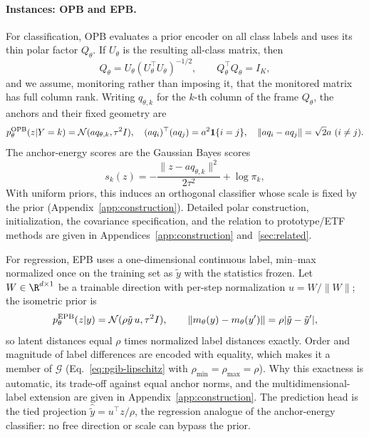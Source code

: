 \paragraph{Instances: OPB and EPB.}\label{sec:opb}
For classification, OPB evaluates a prior encoder on all class labels and uses its
thin polar factor $Q_\theta$. If $U_\theta$ is the resulting all-class matrix, then
\begin{equation}
Q_\theta=U_\theta(U_\theta^\top U_\theta)^{-1/2},
\qquad Q_\theta^\top Q_\theta=I_K,
\label{eq:opb-qr}
\end{equation}
and we assume, monitoring rather than imposing it, that the monitored matrix has
full column rank. Writing
$q_{\theta,k}$ for the $k$-th column of the frame $Q_\theta$, the anchors and their
fixed geometry are
\begin{equation}
p_\theta^{\rm OPB}(z|Y=k)=\mathcal N(aq_{\theta,k},\tau^2I),\quad
(aq_i)^\top(aq_j)=a^2\mathbf 1\{i=j\},
\quad \|aq_i-aq_j\|=\sqrt2a\ (i\ne j).
\label{eq:opb-prior}
\end{equation}
The anchor-energy scores are the Gaussian Bayes scores
\begin{equation}
s_k(z)=-\frac{\|z-aq_{\theta,k}\|^2}{2\tau^2}+\log\pi_k,
\label{eq:opb-energy}
\end{equation}
With uniform priors, this induces an orthogonal classifier whose scale is fixed by
the prior (Appendix~\ref{app:construction}). Detailed polar
construction, initialization, the covariance specification, and the relation to
prototype/ETF methods are given in Appendices~\ref{app:construction} and~\ref{sec:related}.

For regression, EPB uses a one-dimensional continuous label, min--max normalized once on
the training set as $\tilde y$ with the statistics frozen. Let $W\in\R^{d\times1}$ be
a trainable direction with per-step normalization $u=W/\|W\|$; the isometric prior is
\begin{equation}
p_\theta^{\rm EPB}(z|y)=\mathcal N(\rho\tilde y\,u,\tau^2I),\qquad
\|m_\theta(y)-m_\theta(y')\|=\rho|\tilde y-\tilde y'|,
\label{eq:epb-prior}
\end{equation}
so latent distances equal $\rho$ times normalized label distances exactly. Order
and magnitude of label differences are encoded with equality, which makes it a
member of $\mathcal G$ (Eq.~\eqref{eq:pgib-lipschitz} with
$\rho_{\min}=\rho_{\max}=\rho$). Why this exactness is automatic, its
trade-off against equal anchor norms, and the multidimensional-label
extension are given in
Appendix~\ref{app:construction}. The
prediction head is the tied projection $\hat{\tilde y}=u^\top z/\rho$, the regression
analogue of the anchor-energy classifier: no free direction or scale can bypass the
prior.

